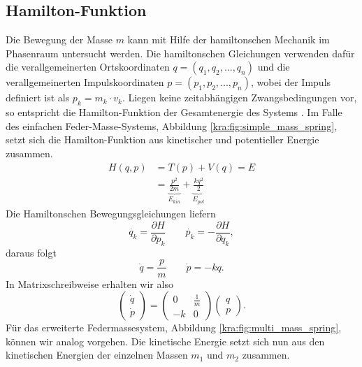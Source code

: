 \subsection{Hamilton-Funktion}
\label{kra:subsection:hamilton-funktion}
Die Bewegung der Masse $m$ kann mit Hilfe der hamiltonschen Mechanik im Phasenraum untersucht werden.
Die hamiltonschen Gleichungen verwenden dafür die verallgemeinerten Ortskoordinaten
$q = (q_{1}, q_{2}, ..., q_{n})$ und die verallgemeinerten Impulskoordinaten $p = (p_{1}, p_{2}, ..., p_{n})$, wobei der Impuls definiert ist als $p_k = m_k \cdot v_k$.
Liegen keine zeitabhängigen Zwangsbedingungen vor, so entspricht die Hamilton-Funktion der Gesamtenergie des Systems \cite{kra:hamilton}.
Im Falle des einfachen Feder-Masse-Systems, Abbildung \ref{kra:fig:simple_mass_spring}, setzt sich die Hamilton-Funktion aus kinetischer und potentieller Energie zusammen.
\begin{equation}
    \label{kra:equation:harmonischer_oszillator}
    \begin{split}
        H(q, p) &= T(p) + V(q) = E \\
        &= \underbrace{\frac{p^2}{2m}}_{\displaystyle{E_{kin}}} + \underbrace{\frac{k q^2}{2}}_{\displaystyle{E_{pot}}}
    \end{split}
\end{equation}
Die Hamiltonschen Bewegungsgleichungen liefern \cite{kra:kanonischegleichungen}
\begin{equation}
    \label{kra:equation:bewegungsgleichung}
    \dot{q_{k}} = \frac{\partial H}{\partial p_k}
    \qquad
    \dot{p_{k}} = -\frac{\partial H}{\partial q_k},
\end{equation}
daraus folgt
\[
    \dot{q} = \frac{p}{m}
    \qquad
    \dot{p} = -kq.
\]
In Matrixschreibweise erhalten wir also
\[
    \begin{pmatrix}
        \dot{q} \\
        \dot{p}
    \end{pmatrix}
    =
    \begin{pmatrix}
        0  & \frac{1}{m} \\
        -k & 0
    \end{pmatrix}
    \begin{pmatrix}
        q \\
        p
    \end{pmatrix}
    .
\]
Für das erweiterte Federmassesystem, Abbildung \ref{kra:fig:multi_mass_spring}, können wir analog vorgehen.
Die kinetische Energie setzt sich nun aus den kinetischen Energien der einzelnen Massen $m_1$ und $m_2$ zusammen.
